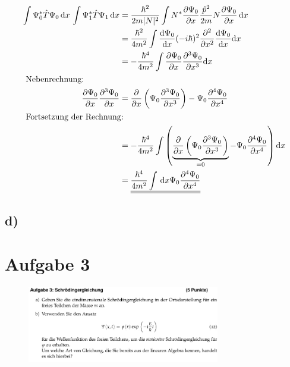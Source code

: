 \begin{align}
    \int \Psi _0^* \hat T \Psi _0 \,\mathrm{d}x\,\int \Psi _1^* \hat T \Psi _1 \, \mathrm{d}x&= \frac{\hbar ^2}{2m\lvert N\rvert^2} \int N^* \frac{\partial \Psi _0}{\partial x} \frac{\hat p ^2}{2m} N \frac{\partial \Psi _0}{\partial x} \,\mathrm{d}x\\
    &= \frac{\hbar ^2}{4m^2} \int \frac{\mathrm{d} \Psi _0}{\mathrm{d} x} (-i \hbar)^2 \frac{\partial ^2}{\partial x^2}\frac{\mathrm{d} \Psi _0}{\mathrm{d} x} \mathrm{d} x\\
    &= -\frac{\hbar ^4}{4m^2} \int \frac{\partial \Psi _0}{\partial x} \frac{\partial ^3 \Psi _0}{\partial x^3} \mathrm{d}x\\
    \intertext{
        Nebenrechnung:
    }
    \frac{\partial \Psi _0}{\partial x}\frac{\partial ^3 \Psi _0}{\partial x}&=\frac{\partial}{\partial x}\left(\Psi _0 \frac{\partial ^3 \Psi _0}{\partial x^3} \right)-\Psi _0 \frac{\partial ^4 \Psi _0}{\partial x^4}\\
    \intertext{
        Fortsetzung der Rechnung:
    }
    &=-\frac{\hbar ^4}{4m^2} \int \left(\underbrace{ \frac{\partial}{\partial x}\left(\Psi _0 \frac{\partial ^3 \Psi _0}{\partial x^3}\right)}_{=0} -\Psi _0 \frac{\partial ^4 \Psi _0}{\partial x^4}  \right) \mathrm{d}x\\
    &= \underline{\underline{\frac{\hbar ^4}{4m^2} \int\,\mathrm{d}x \Psi _0 \frac{\partial ^4\Psi _0}{\partial x^4}  }}
\end{align}


\subsection{d)}



\section{Aufgabe 3}

\begin{figure}[H]
    \centering
    \includegraphics[width=0.75\textwidth]{images/Aufgabe_3ab.jpg}
    \label{fig:3}
\end{figure}

